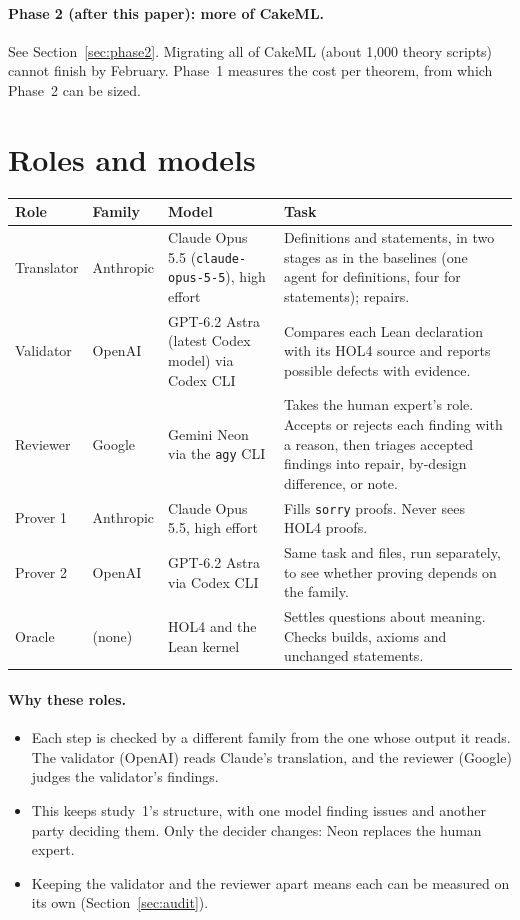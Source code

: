 \documentclass[11pt,a4paper]{article}
\newcommand{\code}[1]{\texttt{#1}}
\begin{document}
\paragraph{Phase 2 (after this paper): more of CakeML.} See Section~\ref{sec:phase2}. Migrating all of CakeML (about 1{,}000 theory scripts) cannot finish by February. Phase~1 measures the cost per theorem, from which Phase~2 can be sized.

\section{Roles and models}
\begin{table}[h]\small
\begin{tabularx}{\textwidth}{@{}lllX@{}}
\toprule
Role & Family & Model & Task\\
\midrule
Translator & Anthropic & Claude Opus 5.5 (\code{claude-opus-5-5}), high effort & Definitions and statements, in two stages as in the baselines (one agent for definitions, four for statements); repairs.\\
Validator & OpenAI & GPT-6.2 Astra (latest Codex model) via Codex CLI & Compares each Lean declaration with its HOL4 source and reports possible defects with evidence.\\
Reviewer & Google & Gemini Neon via the \code{agy} CLI & Takes the human expert's role. Accepts or rejects each finding with a reason, then triages accepted findings into repair, by-design difference, or note.\\
Prover 1 & Anthropic & Claude Opus 5.5, high effort & Fills \code{sorry} proofs. Never sees HOL4 proofs.\\
Prover 2 & OpenAI & GPT-6.2 Astra via Codex CLI & Same task and files, run separately, to see whether proving depends on the family.\\
Oracle & (none) & HOL4 and the Lean kernel & Settles questions about meaning. Checks builds, axioms and unchanged statements.\\
\bottomrule
\end{tabularx}
\end{table}

\paragraph{Why these roles.}
\begin{itemize}
\item Each step is checked by a different family from the one whose output it reads. The validator (OpenAI) reads Claude's translation, and the reviewer (Google) judges the validator's findings.
\item This keeps study~1's structure, with one model finding issues and another party deciding them. Only the decider changes: Neon replaces the human expert.
\item Keeping the validator and the reviewer apart means each can be measured on its own (Section~\ref{sec:audit}).
\end{itemize}
\end{document}
